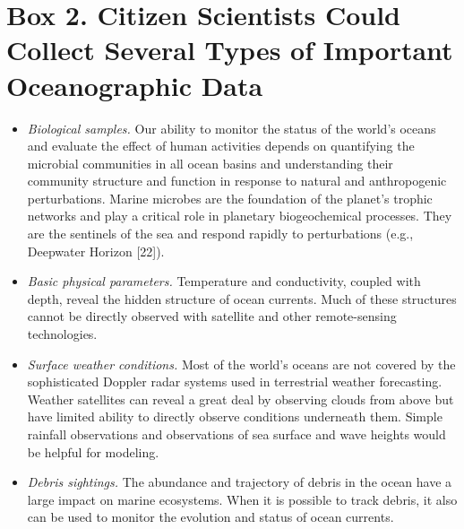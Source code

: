 \section{Box 2. Citizen Scientists Could Collect Several Types of Important Oceanographic Data}

\begin{itemize}

\item{\em Biological samples.} Our ability to monitor the status of the world's oceans and evaluate the effect of human activities depends on quantifying the microbial communities in all ocean basins and understanding their community structure and function in response to natural and anthropogenic perturbations. Marine microbes are the foundation of the planet's trophic networks and play a critical role in planetary biogeochemical processes. They are the sentinels of the sea and respond rapidly to perturbations (e.g., Deepwater Horizon [22]).

\item{\em Basic physical parameters.} Temperature and conductivity, coupled with depth, reveal the hidden structure of ocean currents. Much of these structures cannot be directly observed with satellite and other remote-sensing technologies.

\item{\em Surface weather conditions.} Most of the world's oceans are not covered by the sophisticated Doppler radar systems used in terrestrial weather forecasting. Weather satellites can reveal a great deal by observing clouds from above but have limited ability to directly observe conditions underneath them. Simple rainfall observations and observations of sea surface and wave heights would be helpful for modeling.

\item{\em Debris sightings.} The abundance and trajectory of debris in the ocean have a large impact on marine ecosystems. When it is possible to track debris, it also can be used to monitor the evolution and status of ocean currents.

\end{itemize}